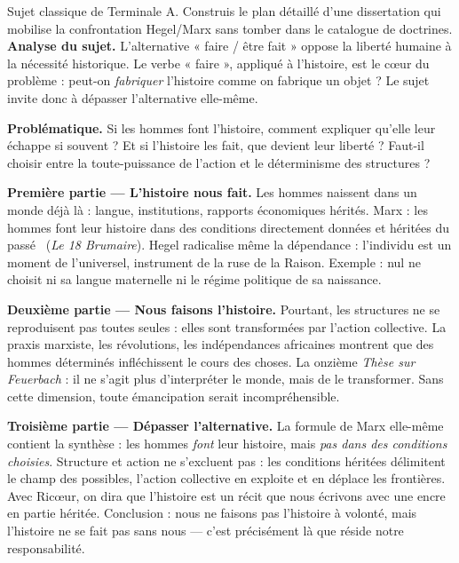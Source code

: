 \documentclass[11pt]{article}
\begin{document}
\begin{exoresolu}
Sujet classique de Terminale A. Construis le plan détaillé d'une dissertation qui mobilise la confrontation Hegel/Marx sans tomber dans le catalogue de doctrines.
\tcblower
\textbf{Analyse du sujet.} L'alternative « faire / être fait » oppose la liberté humaine à la nécessité historique. Le verbe « faire », appliqué à l'histoire, est le cœur du problème : peut-on \emph{fabriquer} l'histoire comme on fabrique un objet ? Le sujet invite donc à dépasser l'alternative elle-même.

\textbf{Problématique.} Si les hommes font l'histoire, comment expliquer qu'elle leur échappe si souvent ? Et si l'histoire les fait, que devient leur liberté ? Faut-il choisir entre la toute-puissance de l'action et le déterminisme des structures ?

\textbf{Première partie — L'histoire nous fait.} Les hommes naissent dans un monde déjà là : langue, institutions, rapports économiques hérités. Marx : les hommes font leur histoire \guillemotleft dans des conditions directement données et héritées du passé \guillemotright\ (\emph{Le 18 Brumaire}). Hegel radicalise même la dépendance : l'individu est un moment de l'universel, instrument de la ruse de la Raison. Exemple : nul ne choisit ni sa langue maternelle ni le régime politique de sa naissance.

\textbf{Deuxième partie — Nous faisons l'histoire.} Pourtant, les structures ne se reproduisent pas toutes seules : elles sont transformées par l'action collective. La praxis marxiste, les révolutions, les indépendances africaines montrent que des hommes déterminés infléchissent le cours des choses. La onzième \emph{Thèse sur Feuerbach} : il ne s'agit plus d'interpréter le monde, mais de le transformer. Sans cette dimension, toute émancipation serait incompréhensible.

\textbf{Troisième partie — Dépasser l'alternative.} La formule de Marx elle-même contient la synthèse : les hommes \emph{font} leur histoire, mais \emph{pas dans des conditions choisies}. Structure et action ne s'excluent pas : les conditions héritées délimitent le champ des possibles, l'action collective en exploite et en déplace les frontières. Avec Ricœur, on dira que l'histoire est un récit que nous écrivons avec une encre en partie héritée. Conclusion : nous ne faisons pas l'histoire à volonté, mais l'histoire ne se fait pas sans nous — c'est précisément là que réside notre responsabilité.
\end{exoresolu}
\end{document}
